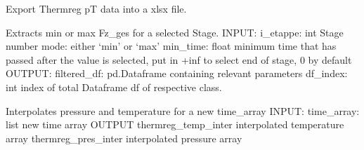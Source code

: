 \documentclass[letterpaper,10pt,english]{sphinxmanual}
\begin{document}
\begin{fulllineitems}

\begin{fulllineitems}
\label{\detokenize{tscw_module:tscw_module.thermreg_DataClasses.ThermregData.export_csv}}
\pysigstartsignatures
{}
\pysigstopsignatures
\sphinxAtStartPar
Export Thermreg p\sphinxhyphen{}T data into a xlsx file.

\end{fulllineitems}


\begin{fulllineitems}
\label{\detokenize{tscw_module:tscw_module.thermreg_DataClasses.ThermregData.extract_max_force}}
\pysigstartsignatures
{}
\pysigstopsignatures
\sphinxAtStartPar
Extracts min or max Fz\_ges for a selected Stage.
INPUT:
i\_etappe: int \sphinxhyphen{} Stage number
mode: either ‘min’ or ‘max’
min\_time: float \sphinxhyphen{} minimum time that has passed after the value is selected, put in +inf to select end of stage, 0 by default
OUTPUT:
filtered\_df: pd.Dataframe containing relevant parameters
df\_index: int \sphinxhyphen{} index of total Dataframe df of respective class.

\end{fulllineitems}


\begin{fulllineitems}
\label{\detokenize{tscw_module:tscw_module.thermreg_DataClasses.ThermregData.interpolate_pt}}
\pysigstartsignatures
{}
\pysigstopsignatures
\sphinxAtStartPar
Interpolates pressure and temperature for a new time\_array
INPUT:
time\_array: list \sphinxhyphen{} new time array
OUTPUT
thermreg\_temp\_inter \sphinxhyphen{} interpolated temperature array
thermreg\_pres\_inter \sphinxhyphen{} interpolated pressure array


\end{fulllineitems}
\end{fulllineitems}
\end{document}
